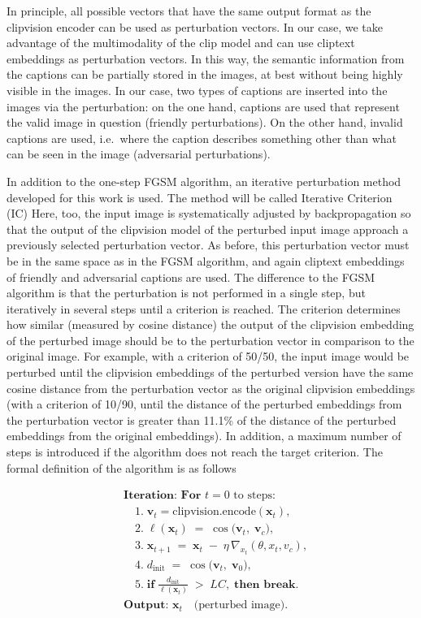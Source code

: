 In principle, all possible vectors that have the same output format as the clipvision encoder can be used as perturbation vectors. In our case, we take advantage of the multimodality of the clip model and can use cliptext embeddings as perturbation vectors. In this way, the semantic information from the captions can be partially stored in the images, at best without being highly visible in the images. In our case, two types of captions are inserted into the images via the perturbation: on the one hand, captions are used that represent the valid image in question (friendly perturbations). On the other hand, invalid captions are used, i.e.\ where the caption describes something other than what can be seen in the image (adversarial perturbations). 

In addition to the one-step FGSM algorithm, an iterative perturbation method developed for this work is used. The method will be called Iterative Criterion (IC) Here, too, the input image is systematically adjusted by backpropagation so that the output of the clipvision model of the perturbed input image approach a previously selected perturbation vector. As before, this perturbation vector must be in the same space as in the FGSM algorithm, and again cliptext embeddings of friendly and adversarial captions are used. The difference to the FGSM algorithm is that the perturbation is not performed in a single step, but iteratively in several steps until a criterion is reached. The criterion determines how similar (measured by cosine distance) the output of the clipvision embedding of the perturbed image should be to the perturbation vector in comparison to the original image. For example, with a criterion of 50/50, the input image would be perturbed until the clipvision embeddings of the perturbed version have the same cosine distance from the perturbation vector as the original clipvision embeddings (with a criterion of 10/90, until the distance of the perturbed embeddings from the perturbation vector is greater than 11.1\% of the distance of the perturbed embeddings from the original embeddings). In addition, a maximum number of steps is introduced if the algorithm does not reach the target criterion. The formal definition of the algorithm is as follows 

\[
\begin{aligned}
& \textbf{Iteration: For } t = 0 \text{ to steps:}\\
& \quad 1.\; \mathbf{v}_t = \mathrm{clipvision.encode}(\mathbf{x}_t), \\[4pt]
& \quad 2.\; \ell(\mathbf{x}_t) 
\;=\; \cos\bigl(\mathbf{v}_t,\;\mathbf{v}_c\bigr), \\[4pt]
& \quad 3.\; \mathbf{x}_{t+1} 
\;=\; \mathbf{x}_t \;-\; \eta \,\nabla_{x_t} (\theta, x_t, v_c), \\[4pt]
& \quad 4.\; d_{\text{init}} 
\;=\; \cos\bigl(\mathbf{v}_t,\;\mathbf{v}_0\bigr), \\[4pt]
& \quad 5.\; \textbf{if} \;\frac{d_{\text{init}}}{\ell(\mathbf{x}_t)} 
\;>\; LC, \;\textbf{then break}.\\[6pt]
%
& \textbf{Output: } \mathbf{x}_t \quad \text{(perturbed image)}.
\end{aligned}
\]


